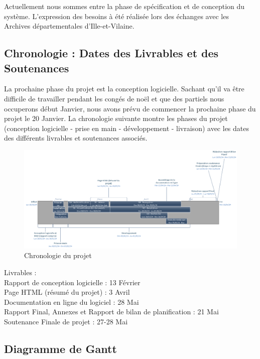 \documentclass[a4paper]{article}
\begin{document}
	Actuellement nous sommes entre la phase de spécification et de conception du système. L'expression des besoins à été réalisée lors des échanges avec les Archives départementales d’Ille-et-Vilaine.
	
\subsection{Chronologie : Dates des Livrables et des Soutenances}

	La prochaine phase du projet est la conception logicielle. Sachant qu'il va être difficile de travailler pendant les congés de noël et que des partiels nous occuperons début Janvier, nous avons prévu de commencer la prochaine phase du projet le 20 Janvier. La chronologie suivante montre les phases du projet (conception logicielle - prise en main - développement - livraison) avec les dates des différents livrables et soutenances associés. 
	
\begin{figure}[H]
\centering
\includegraphics[width=\textwidth]{chronologie.png}
\caption{Chronologie du projet}
\label{fig:chronologie}
\end{figure}

	Livrables : \\
		Rapport de conception logicielle : 13 Février\\
		Page HTML (résumé du projet) : 3 Avril\\
		Documentation en ligne du logiciel : 28 Mai\\
		Rapport Final, Annexes et Rapport de bilan de planification : 21 Mai\\
				
	Soutenance Finale de projet : 27-28 Mai\\

\subsection{Diagramme de Gantt}
\end{document}
